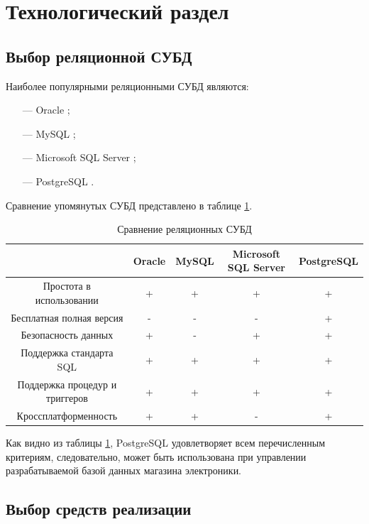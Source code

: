 \section{Технологический раздел}

\subsection{Выбор реляционной СУБД}

Наиболее популярными реляционными СУБД являются:

\begin{itemize}[leftmargin=0.7cm +  - ]
	\item[---] Oracle \cite{oracle};
	\item[---] MySQL \cite{mysql};
	\item[---] Microsoft SQL Server \cite{sqlserver};
	\item[---] PostgreSQL \cite{postgresql}.
\end{itemize}

Сравнение упомянутых СУБД представлено в таблице \ref{tech:cmpsubd}.

\begin{table}[H]
	\caption{Сравнение реляционных СУБД}
	\label{tech:cmpsubd}
	\small
	\begin{tabular}{|c|c|c|c|c|}
		\hline
		 & Oracle & MySQL & Microsoft SQL Server & PostgreSQL \\ \hline
		Простота в использовании & + & + & + & + \\ \hline
		Бесплатная полная версия & - & - & - & + \\ \hline
		Безопасность данных & + & - & + & + \\ \hline
		Поддержка стандарта SQL & + & + & + & + \\ \hline
		Поддержка процедур и триггеров & + & + & + & + \\ \hline
		Кроссплатформенность & + & + & - & + \\ \hline
	\end{tabular}
\end{table}

Как видно из таблицы \ref{tech:cmpsubd}, PostgreSQL удовлетворяет всем перечисленным критериям, следовательно, может быть использована при управлении разрабатываемой базой данных магазина электроники.

\subsection{Выбор средств реализации}

